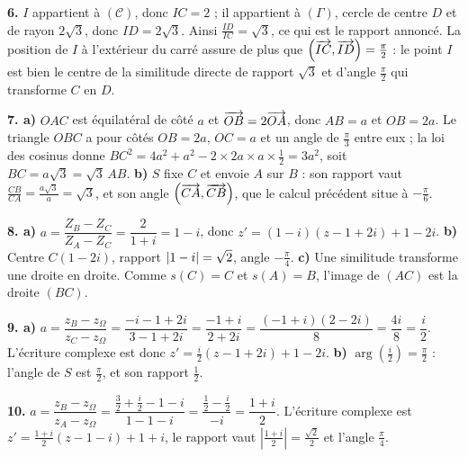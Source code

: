\begin{corrige}[annales]
\textbf{6.} $I$ appartient à $(\mathcal C)$, donc $IC = 2$ ; il appartient à
$(\Gamma)$, cercle de centre $D$ et de rayon $2\sqrt3$, donc $ID = 2\sqrt3$.
Ainsi $\frac{ID}{IC} = \sqrt3$, ce qui est le rapport annoncé. La position de
$I$ à l'extérieur du carré assure de plus que
$\left(\overrightarrow{IC},\overrightarrow{ID}\right) = \frac{\pi}{2}$ : le point $I$ est bien le
centre de la similitude directe de rapport $\sqrt3$ et d'angle
$\frac{\pi}{2}$ qui transforme $C$ en $D$.

\textbf{7. a)} $OAC$ est équilatéral de côté $a$ et $\overrightarrow{OB} = 2\overrightarrow{OA}$,
donc $AB = a$ et $OB = 2a$. Le triangle $OBC$ a pour côtés $OB = 2a$,
$OC = a$ et un angle de $\frac{\pi}{3}$ entre eux ; la loi des cosinus donne
$BC^{2} = 4a^{2}+a^{2}-2 \times 2a \times a \times \frac12 = 3a^{2}$, soit
$BC = a\sqrt3 = \sqrt3\,AB$.
\textbf{b)} $S$ fixe $C$ et envoie $A$ sur $B$ : son rapport vaut
$\frac{CB}{CA} = \frac{a\sqrt3}{a} = \sqrt3$, et son angle
$\left(\overrightarrow{CA},\overrightarrow{CB}\right)$, que le calcul précédent situe à
$-\frac{\pi}{6}$.

\textbf{8. a)} $a = \dfrac{Z_{B}-Z_{C}}{Z_{A}-Z_{C}} = \dfrac{2}{1+i} = 1-i$,
donc $z' = (1-i)(z-1+2i)+1-2i$.
\textbf{b)} Centre $C(1-2i)$, rapport $\left|1-i\right| = \sqrt2$, angle
$-\frac{\pi}{4}$.
\textbf{c)} Une similitude transforme une droite en droite. Comme
$s(C) = C$ et $s(A) = B$, l'image de $(AC)$ est la droite $(BC)$.

\textbf{9. a)} $a = \dfrac{z_{B}-z_{\Omega}}{z_{C}-z_{\Omega}}
= \dfrac{-i-1+2i}{3-1+2i} = \dfrac{-1+i}{2+2i}
= \dfrac{(-1+i)(2-2i)}{8} = \dfrac{4i}{8} = \dfrac i2$. L'écriture complexe
est donc $z' = \frac i2\left(z-1+2i\right)+1-2i$.
\textbf{b)} $\arg\!\left(\frac i2\right) = \frac{\pi}{2}$ : l'angle de $S$ est
$\frac{\pi}{2}$, et son rapport $\frac12$.

\textbf{10.} $a = \dfrac{z_{B}-z_{\Omega}}{z_{A}-z_{\Omega}}
= \dfrac{\frac32+\frac i2-1-i}{1-1-i}
= \dfrac{\frac12-\frac i2}{-i} = \dfrac{1+i}{2}$. L'écriture complexe est
$z' = \frac{1+i}{2}\left(z-1-i\right)+1+i$, le rapport vaut
$\left|\frac{1+i}{2}\right| = \frac{\sqrt2}{2}$ et l'angle
$\frac{\pi}{4}$.
\end{corrige}

